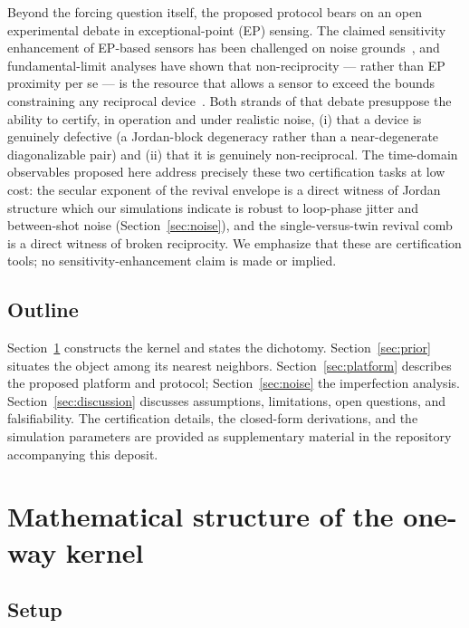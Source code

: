 \documentclass[11pt,a4paper]{article}
\begin{document}
Beyond the forcing question itself, the proposed protocol bears on an open
experimental debate in exceptional-point (EP) sensing. The claimed sensitivity
enhancement of EP-based sensors has been challenged on noise
grounds~\cite{Langbein2018,Wiersig2020}, and fundamental-limit analyses have
shown that non-reciprocity --- rather than EP proximity per se --- is the
resource that allows a sensor to exceed the bounds constraining any reciprocal
device~\cite{LauClerk2018}. Both strands of that debate presuppose the ability
to certify, in operation and under realistic noise, (i) that a device is
genuinely defective (a Jordan-block degeneracy rather than a near-degenerate
diagonalizable pair) and (ii) that it is genuinely non-reciprocal. The
time-domain observables proposed here address precisely these two
certification tasks at low cost: the secular exponent of the revival envelope
is a direct witness of Jordan structure which our simulations indicate is
robust to loop-phase jitter and between-shot noise (Section~\ref{sec:noise}),
and the single-versus-twin revival comb is a direct witness of broken
reciprocity. We emphasize that these are certification tools; no
sensitivity-enhancement claim is made or implied.

\subsection{Outline}

Section~\ref{sec:structure} constructs the kernel and states the dichotomy.
Section~\ref{sec:prior} situates the object among its nearest neighbors.
Section~\ref{sec:platform} describes the proposed platform and protocol;
Section~\ref{sec:noise} the imperfection analysis. Section~\ref{sec:discussion}
discusses assumptions, limitations, open questions, and falsifiability. The
certification details, the closed-form derivations, and the simulation
parameters are provided as supplementary material in the repository
accompanying this deposit.

\section{Mathematical structure of the one-way kernel}
\label{sec:structure}

\subsection{Setup}
\end{document}

